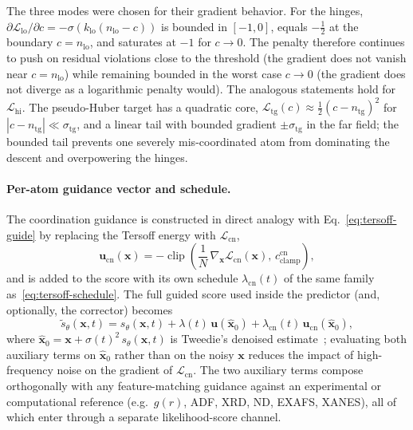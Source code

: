 The three modes were chosen for their gradient behavior. For the hinges,
$\partial\mathcal{L}_{\mathrm{lo}}/\partial c
= -\sigma\!\left(k_{\mathrm{lo}}(n_{\mathrm{lo}}-c)\right)$ is bounded in
$[-1,0]$, equals $-\tfrac{1}{2}$ at the boundary $c=n_{\mathrm{lo}}$, and
saturates at $-1$ for $c\to 0$. The penalty therefore continues to push on
residual violations close to the threshold (the gradient does not vanish near
$c=n_{\mathrm{lo}}$) while remaining bounded in the worst case
$c\to 0$ (the gradient does not diverge as a logarithmic penalty would). The
analogous statements hold for $\mathcal{L}_{\mathrm{hi}}$. The pseudo-Huber
target has a quadratic core,
$\mathcal{L}_{\mathrm{tg}}(c)\approx \tfrac{1}{2}(c-n_{\mathrm{tg}})^{2}$ for
$|c-n_{\mathrm{tg}}|\ll\sigma_{\mathrm{tg}}$, and a linear tail with bounded
gradient $\pm\sigma_{\mathrm{tg}}$ in the far field; the bounded tail
prevents one severely mis-coordinated atom from dominating the descent and
overpowering the hinges.

\paragraph{Per-atom guidance vector and schedule.}
The coordination guidance is constructed in direct analogy with
Eq.~\eqref{eq:tersoff-guide} by replacing the Tersoff energy with
$\mathcal{L}_{\mathrm{cn}}$,
\begin{equation}
    \mathbf{u}_{\mathrm{cn}}(\mathbf{x})
    = -\operatorname{clip}\!\left(
        \frac{1}{N}\,\nabla_{\mathbf{x}}\mathcal{L}_{\mathrm{cn}}(\mathbf{x}),\,
        c_{\mathrm{clamp}}^{\mathrm{cn}}
      \right),
    \label{eq:coord-guide}
\end{equation}
and is added to the score with its own schedule
$\lambda_{\mathrm{cn}}(t)$ of the same family
as~\eqref{eq:tersoff-schedule}. The full guided score used inside the
predictor (and, optionally, the corrector) becomes
\begin{equation}
    \tilde{s}_\theta(\mathbf{x},t)
    = s_\theta(\mathbf{x},t)
    + \lambda(t)\,\mathbf{u}(\hat{\mathbf{x}}_{0})
    + \lambda_{\mathrm{cn}}(t)\,\mathbf{u}_{\mathrm{cn}}(\hat{\mathbf{x}}_{0}),
    \label{eq:total-guided-score}
\end{equation}
where $\hat{\mathbf{x}}_{0}=\mathbf{x}+\sigma(t)^{2}\,s_\theta(\mathbf{x},t)$
is Tweedie's denoised estimate~\cite{efron2011tweedie}; evaluating both
auxiliary terms on $\hat{\mathbf{x}}_{0}$ rather than on the noisy
$\mathbf{x}$ reduces the impact of high-frequency noise on the gradient of
$\mathcal{L}_{\mathrm{cn}}$. The two auxiliary terms compose orthogonally with
any feature-matching guidance against an experimental or computational
reference (e.g.\ $g(r)$, ADF, XRD, ND, EXAFS, XANES), all of which enter
through a separate likelihood-score channel.

